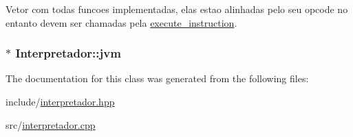 Vetor com todas funcoes implementadas, elas estao alinhadas pelo seu opcode no entanto devem ser chamadas pela \hyperlink{classInterpretador_a2bec82447756b2f6a43e68164ddbdde1}{execute\+\_\+instruction}. 

\hypertarget{classInterpretador_aed3bd481ff345333414aa70360a94b7c}{
\subsubsection[{jvm}]{$\ast$ Interpretador\+::jvm\hspace{0.3cm}{\ttfamily [private]}}}\label{classInterpretador_aed3bd481ff345333414aa70360a94b7c}


The documentation for this class was generated from the following files\+:\begin{DoxyCompactItemize}
\item 
include/\hyperlink{interpretador_8hpp}{interpretador.\+hpp}\item 
src/\hyperlink{interpretador_8cpp}{interpretador.\+cpp}\end{DoxyCompactItemize}
